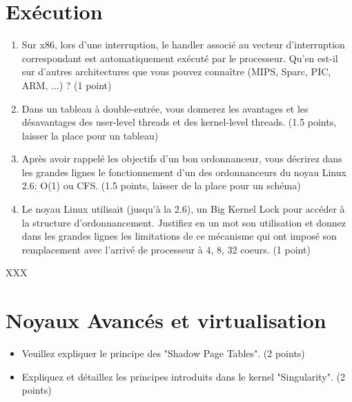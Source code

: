 %
%

\section{Ex\'ecution
         {\hfill{} }}

\begin{enumerate}
  \item
    Sur x86, lors d'une interruption, le handler associ\'e au vecteur
    d'interruption correspondant est automatiquement ex\'ecut\'e par le
    processeur. Qu'en est-il sur d'autres architectures que vous pouvez
    conna\^itre (MIPS, Sparc, PIC, ARM, ...) ? (1 point)
  \item
    Dans un tableau \`a double-entr\'ee, vous donnerez les avantages et les
    d\'esavantages des user-level threads et des kernel-level threads.
    (1.5 points, laisser la place pour un tableau)
  \item
    Apr\`es avoir rappel\'e les objectifs d'un bon ordonnanceur, vous
    d\'ecrirez dans les grandes lignes le fonctionnement d'un des
    ordonnanceurs du noyau Linux 2.6: O(1) ou CFS. (1.5 points, laisser
    de la place pour un sch\'ema)
  \item
    Le noyau Linux utilisait (jusqu'\`a la 2.6), un Big Kernel Lock pour
    acc\'eder \`a la structure d'ordonnancement. Justifiez en un mot son
    utilisation et donnez dans les grandes lignes les limitations de ce
    m\'ecanisme qui ont impos\'e son remplacement avec l'arriv\'e de
    processeur \`a 4, 8, 32 coeurs. (1 point)
\end{enumerate}

\begin{correction}

XXX

\end{correction}

%
%

\section{Noyaux Avanc\'es et virtualisation
         }


\begin{itemize}
  \item
    Veuillez expliquer le principe des "Shadow Page Tables". (2 points)
  \item
    Expliquez et d\'etaillez les principes introduits dans le kernel
    "Singularity". (2 points)
\end{itemize}

